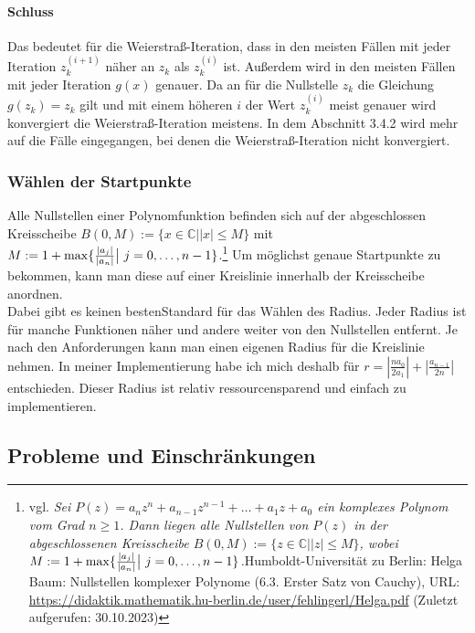 \documentclass[12pt]{article}
\begin{document}
\paragraph{Schluss}
Das bedeutet für die Weierstraß-Iteration, dass in den meisten Fällen mit jeder Iteration $z_k^{(i+1)}$ näher an $z_k$ als $z_k^{(i)}$ ist. Außerdem wird in den meisten Fällen mit jeder Iteration $g(x)$ genauer. Da an für die Nullstelle $z_k$ die Gleichung $g(z_k) = z_k$ gilt und mit einem höheren $i$ der Wert $z_k^{(i)}$ meist genauer wird konvergiert die Weierstraß-Iteration meistens. In dem Abschnitt 3.4.2 wird mehr auf die Fälle eingegangen, bei denen die Weierstraß-Iteration nicht konvergiert.

\subsubsection{Wählen der Startpunkte}
Alle Nullstellen einer Polynomfunktion befinden sich auf der abgeschlossen Kreisscheibe  $B(0,M) := \{x \in \mathbb{C} \bigr| |x| \le M\}$ mit $M := 1 + \max\{\frac{|a_j|}{|a_n|}\bigr|\text{\space}j=0,\dots,n-1\}$.\footnote{
    vgl. \glqq\textit{Sei $P(z) = a_nz^n+a_{n-1}z^{n-1}+\dots+a_1z+a_0$ ein komplexes Polynom vom Grad $n \ge 1$. Dann liegen alle Nullstellen von $P(z)$ in der abgeschlossenen Kreisscheibe $B(0,M) := \{z \in \mathbb{C} \bigr| |z| \le M\}$, wobei $M := 1 + \max\{\frac{|a_j|}{|a_n|}\bigr|\text{\space}j=0,\dots,n-1\}$.}\grqq\space Humboldt-Universität zu Berlin: Helga Baum: Nullstellen komplexer Polynome (6.3. Erster Satz von Cauchy), URL: \url{https://didaktik.mathematik.hu-berlin.de/user/fehlingerl/Helga.pdf} (Zuletzt aufgerufen: 30.10.2023)
} Um möglichst genaue Startpunkte zu bekommen, kann man diese auf einer Kreislinie innerhalb der Kreisscheibe anordnen. \\
Dabei gibt es keinen \glqq besten\grqq\space Standard für das Wählen des Radius. Jeder Radius ist für manche Funktionen näher und andere weiter von den Nullstellen entfernt. Je nach den Anforderungen kann man einen eigenen Radius für die Kreislinie nehmen. In meiner Implementierung habe ich mich deshalb für $r = |\frac{na_0}{2a_1}| + |\frac{a_{n-1}}{2n}|$ entschieden.
Dieser Radius ist relativ ressourcensparend und einfach zu implementieren.

\subsection{Probleme und Einschränkungen}
\end{document}
